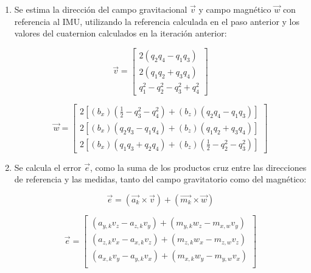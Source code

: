 \begin{enumerate}
        \item Se estima la dirección del campo gravitacional \textbf{\textit{$\vec{v}$}} y campo magnético \textbf{\textit{$\vec{w}$}} con referencia al IMU, utilizando la referencia calculada en el paso anterior y los valores del cuaternion calculados en la iteración anterior:
        
        \begin{equation}        
            \vec{v} = 
                \begin{bmatrix}
                    2(q_2q_4 - q_1q_3) \\
                    2(q_1q_2 + q_3q_4) \\
                    q^2_1 - q^2_2 - q^2_3 +q^2_4  
                \end{bmatrix} 
        \end{equation}

        \begin{equation}        
            \vec{w} = 
                \begin{bmatrix}
                    2[(b_x)(\frac{1}{2} - q^2_3 - q^2_4) + (b_z)(q_2q_4 - q_1q_3)] \\
                    2[(b_x)(q_2q_3 - q_1q_4) + (b_z)(q_1q_2 + q_3q_4)] \\
                    2[(b_x)(q_1q_3 + q_2q_4) + (b_z)(\frac{1}{2} - q^2_2 - q^2_3)] 
                \end{bmatrix} 
        \end{equation}

        \item Se calcula el error $\vec{e}$, como la suma de los productos cruz entre las direcciones de referencia y las medidas, tanto del campo gravitatorio como del magnético:
        
        \begin{equation}
            \vec{e} = (\vec{a_k} \times \vec{v}) + (\vec{m_k} \times \vec{w}) 
        \end{equation}
            
        \begin{equation}
            \vec{e} = 
                \begin{bmatrix}
                    (a_{y,k}v_z - a_{z,k}v_y) + (m_{y,k}w_z - m_{x,w}v_y) \\
                    (a_{z,k}v_x - a_{x,k}v_z) + (m_{z,k}w_x - m_{z,w}v_z) \\
                    (a_{x,k}v_y - a_{y,k}v_x) + (m_{x,k}w_y - m_{y,w}v_x) \\
                \end{bmatrix} 
        \end{equation}
            

\end{enumerate}
